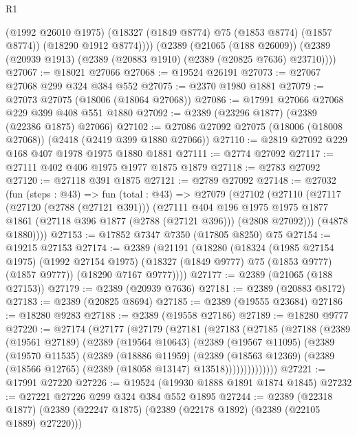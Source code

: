 \begin{lexlean}{R1}
\begin{coremodule}
          (@1992 @26010 @1975)
          (@18327 (@1849 @8774) @75 (@1853 @8774) (@1857 @8774))
          (@18290 @1912 @8774))))
    (@2389
      (@21065 (@188 @26009))
      (@2389 (@20939 @1913) (@2389 (@20883 @1910) (@2389 (@20825 @7636) @23710))))
@27067 := @18021 @27066
@27068 := @19524 @26191
@27073 := @27067 @27068 @299 @324 @384 @552
@27075 := @2370 @1980 @1881
@27079 := @27073 @27075 (@18006 (@18064 @27068))
@27086 := @17991 @27066 @27068 @229 @399 @408 @551 @1880
@27092 := @2389 (@23296 @1877) (@2389 (@22386 @1875) @27066)
@27102 := @27086 @27092 @27075 (@18006 (@18008 @27068)) (@2418 (@2419 @399 @1880 @27066))
@27110 := @2819 @27092 @229 @168 @407 @1978 @1975 @1880 @1881
@27111 := @2774 @27092
@27117 := @27111 @402 @406 @1975 @1977 @1875 @1879
@27118 := @2783 @27092
@27120 := @27118 @391 @1875
@27121 := @2789 @27092
@27148 := @27032
    (fun (steps : @43) =>
    fun (total : @43) =>
    @27079
      (@27102
        (@27110
          (@27117
            (@27120 (@2788 (@27121 @391)))
            (@27111
              @404
              @196
              @1975
              @1975
              @1877
              @1861
              (@27118 @396 @1877 (@2788 (@27121 @396)))
              (@2808 @27092)))
          (@4878 @1880))))
@27153 := @17852 @7347 @7350 (@17805 @8250) @75
@27154 := @19215 @27153
@27174 := @2389
    (@21191
      (@18280
        (@18324
          (@1985 @27154 @1975)
          (@1992 @27154 @1975)
          (@18327 (@1849 @9777) @75 (@1853 @9777) (@1857 @9777))
          (@18290 @7167 @9777))))
@27177 := @2389 (@21065 (@188 @27153))
@27179 := @2389 (@20939 @7636)
@27181 := @2389 (@20883 @8172)
@27183 := @2389 (@20825 @8694)
@27185 := @2389 (@19555 @23684)
@27186 := @18280 @9283
@27188 := @2389 (@19558 @27186)
@27189 := @18280 @9777
@27220 := @27174
    (@27177
      (@27179
        (@27181
          (@27183
            (@27185
              (@27188
                (@2389
                  (@19561 @27189)
                  (@2389
                    (@19564 @10643)
                    (@2389
                      (@19567 @11095)
                      (@2389
                        (@19570 @11535)
                        (@2389
                          (@18886 @11959)
                          (@2389
                            (@18563 @12369)
                            (@2389 (@18566 @12765) (@2389 (@18058 @13147) @13518))))))))))))))
@27221 := @17991 @27220
@27226 := @19524 (@19930 @1888 @1891 @1874 @1845)
@27232 := @27221 @27226 @299 @324 @384 @552 @1895
@27244 := @2389
    (@22318 @1877)
    (@2389 (@22247 @1875) (@2389 (@22178 @1892) (@2389 (@22105 @1889) @27220)))

\end{coremodule}
\end{lexlean}
